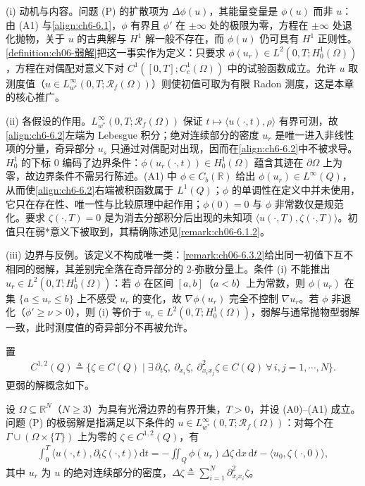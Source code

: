 \documentclass[../../main.tex]{subfiles}%
\begin{document}
\begin{remark}\label{remark:ch06-弱解动机}
(i) 动机与内容。问题 (P) 的扩散项为 $\Delta\phi(u)$，其能量变量是 $\phi(u)$ 而非 $u$：由 (A1) 与\eqref{align:ch6-6.1}，$\phi$ 有界且 $\phi'$ 在 $\pm\infty$ 处的极限为零，方程在 $\pm\infty$ 处退化抛物，关于 $u$ 的古典解与 $H^1$ 解一般不存在，而 $\phi(u)$ 仍可具有 $H^1$ 正则性。\cref{definition:ch06-弱解}把这一事实作为定义：只要求 $\phi(u_r)\in L^2(0,T;H^1_0(\Omega))$，方程在对偶配对意义下对 $C^1([0,T];C^1_c(\Omega))$ 中的试验函数成立。允许 $u$ 取测度值（$u\in L^\infty_{w^*}(0,T;\mathscr{R}_f(\Omega))$）则使初值可取为有限 Radon 测度，这是本章的核心推广。

(ii) 各假设的作用。$L^\infty_{w^*}(0,T;\mathscr{R}_f(\Omega))$ 保证 $t\mapsto\langle u(\cdot,t),\rho\rangle$ 有界可测，故\eqref{align:ch6-6.2}左端为 Lebesgue 积分；绝对连续部分的密度 $u_r$ 是唯一进入非线性项的分量，奇异部分 $u_s$ 只通过对偶配对出现，因而在\eqref{align:ch6-6.2}中不被求导。$H^1_0$ 的下标 $0$ 编码了边界条件：$\phi(u_r(\cdot,t))\in H^1_0(\Omega)$ 蕴含其迹在 $\partial\Omega$ 上为零，故边界条件不需另行陈述。(A1) 中 $\phi\in C_b(\mathbb{R})$ 给出 $\phi(u_r)\in L^\infty(Q)$，从而使\eqref{align:ch6-6.2}右端被积函数属于 $L^1(Q)$；$\phi$ 的单调性在定义中并未使用，它只在存在性、唯一性与比较原理中起作用；$\phi(0)=0$ 与 $\phi$ 非常数仅是规范化。要求 $\zeta(\cdot,T)=0$ 是为消去分部积分后出现的未知项 $\langle u(\cdot,T),\zeta(\cdot,T)\rangle$。初值只在弱*意义下被取到，其精确陈述见\cref{remark:ch06-6.1.2}。

(iii) 边界与反例。该定义不构成唯一类：\cref{remark:ch06-6.3.2}给出同一初值下互不相同的弱解，其差别完全落在奇异部分的 $2$-弥散分量上。条件 (i) 不能推出 $u_r\in L^2(0,T;H^1_0(\Omega))$：若 $\phi$ 在区间 $[a,b]$（$a<b$）上为常数，则 $\phi(u_r)$ 在集 $\{a\leqslant u_r\leqslant b\}$ 上不感受 $u_r$ 的变化，故 $\nabla\phi(u_r)$ 完全不控制 $\nabla u_r$。若 $\phi$ 非退化（$\phi'\geqslant\nu>0$），则 (i) 等价于 $u_r\in L^2(0,T;H^1_0(\Omega))$，弱解与通常抛物型弱解一致，此时测度值的奇异部分不再被允许。
\end{remark}
置
\begin{align*}
C^{1,2}(Q)\triangleq\{\zeta\in C(Q)\mid \exists\,\partial_t\zeta,\ \partial_{x_i}\zeta,\ \partial^2_{x_ix_j}\zeta\in C(Q)\ \forall\,i,j=1,\cdots,N\}.
\end{align*}
更弱的解概念如下。
\begin{definition}\label{definition:ch06-极弱解}
设 $\Omega\subseteq\mathbb{R}^N$（$N\geqslant3$）为具有光滑边界的有界开集，$T>0$，并设 (A0)--(A1) 成立。问题 (P) 的极弱解是指满足以下条件的 $u\in L^\infty_{w^*}(0,T;\mathscr{R}_f(\Omega))$：对每个在 $\Gamma\cup(\Omega\times\{T\})$ 上为零的 $\zeta\in C^{1,2}(Q)$，有
\begin{align}
\int_0^T\langle u(\cdot,t),\partial_t\zeta(\cdot,t)\rangle\,\mathrm{d}t
= -\iint_Q\phi(u_r)\Delta\zeta\,\mathrm{d}x\,\mathrm{d}t
-\langle u_0,\zeta(\cdot,0)\rangle , \label{align:ch6-6.3}
\end{align}
其中 $u_r$ 为 $u$ 的绝对连续部分的密度，$\Delta\zeta\triangleq\sum_{i=1}^N\partial^2_{x_ix_i}\zeta$。
\end{definition}
\end{document}
